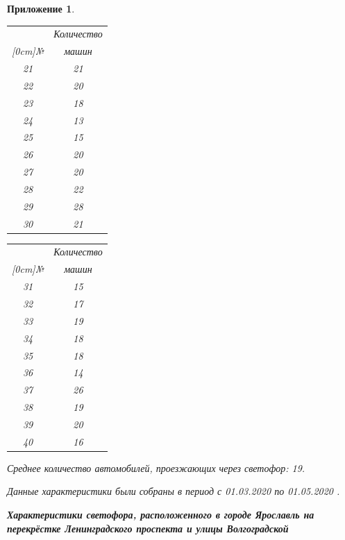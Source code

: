 \documentclass[12pt, a4paper]{extarticle}
\numberwithin{equation}{section}
\newtheorem{attachment}{\hspace{12cm}  Приложение}
\numberwithin{figure}{section}
\begin{document}
\begin{attachment}
\begin{table}[h!]
\begin{minipage}{0.23\linewidth}
		\begin{tabular}{|c|c|}
			\hline
			& Количество \\ 
			\raisebox{1.5ex}[0cm]{№}
			& машин 
			\\\hline
			21 & 21
			\\\hline
			22 & 20
			\\\hline
			23 & 18
			\\\hline
			24 & 13
			\\\hline
			25 & 15
			\\\hline
			26 & 20
			\\\hline
			27 & 20
			\\\hline
			28 & 22
			\\\hline
			29 & 28
			\\\hline
			30 & 21
			\\\hline
		\end{tabular}
	\end{minipage} 
	\begin{minipage}{0.23\linewidth}
		\centering
	
		\begin{tabular}{|c|c|}
			\hline
			& Количество \\ 
			\raisebox{1.5ex}[0cm]{№}
			& машин 
			\\\hline
			31 & 15
			\\\hline
			32 & 17
			\\\hline
			33 & 19
			\\\hline
			34 & 18
			\\\hline
			35 & 18
			\\\hline
			36 & 14
			\\\hline
			37 & 26
			\\\hline
			38 & 19
			\\\hline
			39 & 20
			\\\hline
			40 & 16
			\\\hline
		\end{tabular}
	\end{minipage}
\end{table}

\noindent Среднее количество автомобилей, проезжающих через светофор: 19.
\newline

\noindent\textup{Данные характеристики были собраны в период с 01.03.2020 по 01.05.2020 }.
\newpage

\textup{\textbf{Характеристики светофора, расположенного в городе Ярославль на перекрёстке Ленинградского проспекта и улицы Волгоградской }}
\newline


\end{attachment}
\end{document}
